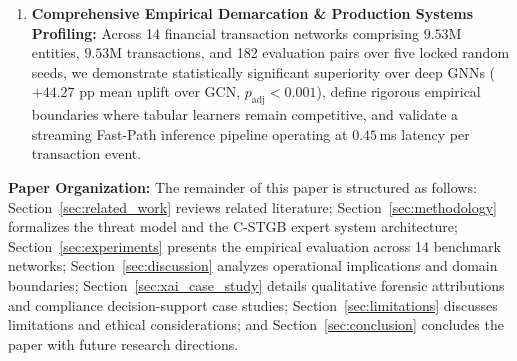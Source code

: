 \begin{enumerate}
    \item \textbf{Comprehensive Empirical Demarcation \& Production Systems Profiling:} Across 14 financial transaction networks comprising $9.53\text{M}$ entities, $9.53\text{M}$ transactions, and 182 evaluation pairs over five locked random seeds, we demonstrate statistically significant superiority over deep GNNs ($+44.27\text{ pp}$ mean uplift over GCN, $p_{\text{adj}} < 0.001$), define rigorous empirical boundaries where tabular learners remain competitive, and validate a streaming Fast-Path inference pipeline operating at $0.45$\,ms latency per transaction event.
\end{enumerate}

\textbf{Paper Organization:} The remainder of this paper is structured as follows: Section~\ref{sec:related_work} reviews related literature; Section~\ref{sec:methodology} formalizes the threat model and the C-STGB expert system architecture; Section~\ref{sec:experiments} presents the empirical evaluation across 14 benchmark networks; Section~\ref{sec:discussion} analyzes operational implications and domain boundaries; Section~\ref{sec:xai_case_study} details qualitative forensic attributions and compliance decision-support case studies; Section~\ref{sec:limitations} discusses limitations and ethical considerations; and Section~\ref{sec:conclusion} concludes the paper with future research directions.
